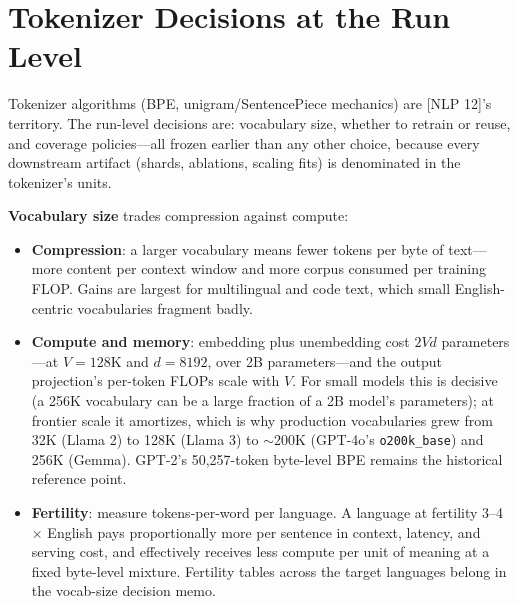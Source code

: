 \section{Tokenizer Decisions at the Run Level}
\label{sec:pretrain_tokenizer}

Tokenizer algorithms (BPE, unigram/SentencePiece mechanics) are [NLP 12]'s territory. The run-level decisions are: vocabulary size, whether to retrain or reuse, and coverage policies---all frozen earlier than any other choice, because every downstream artifact (shards, ablations, scaling fits) is denominated in the tokenizer's units.

\textbf{Vocabulary size} trades compression against compute:
\begin{itemize}
    \item \textbf{Compression}: a larger vocabulary means fewer tokens per byte of text---more content per context window and more corpus consumed per training FLOP. Gains are largest for multilingual and code text, which small English-centric vocabularies fragment badly.
    \item \textbf{Compute and memory}: embedding plus unembedding cost $2Vd$ parameters---at $V = 128$K and $d = 8192$, over 2B parameters---and the output projection's per-token FLOPs scale with $V$. For small models this is decisive (a 256K vocabulary can be a large fraction of a 2B model's parameters); at frontier scale it amortizes, which is why production vocabularies grew from 32K (Llama 2) to 128K (Llama 3) to $\sim$200K (GPT-4o's \texttt{o200k\_base}) and 256K (Gemma). GPT-2's 50,257-token byte-level BPE remains the historical reference point.
    \item \textbf{Fertility}: measure tokens-per-word per language. A language at fertility 3--4$\times$ English pays proportionally more per sentence in context, latency, and serving cost, and effectively receives less compute per unit of meaning at a fixed byte-level mixture. Fertility tables across the target languages belong in the vocab-size decision memo.
\end{itemize}

